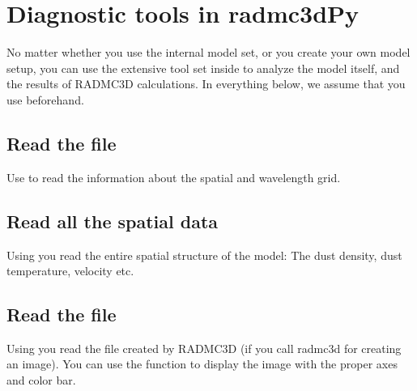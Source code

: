 \documentclass[letterpaper,10pt,english]{sphinxmanual}
\begin{document}
\begin{sphinxVerbatim}[commandchars=\\\{\}]
   
   
   
\end{sphinxVerbatim}


\section{Diagnostic tools in radmc3dPy}
\label{\detokenize{pythontools:diagnostic-tools-in-radmc3dpy}}
No matter whether you use the \sphinxhyphen{}internal model set, or you create
your own model setup, you can use the extensive tool set inside  to
analyze the model itself, and the results of RADMC\sphinxhyphen{}3D calculations. In
everything below, we assume that you use  beforehand.


\subsection{Read the  file}
\label{\detokenize{pythontools:read-the-amr-grid-inp-file}}
Use  to read the information about the
spatial and wavelength grid.


\subsection{Read all the spatial data}
\label{\detokenize{pythontools:read-all-the-spatial-data}}
Using  you read the entire spatial
structure of the model: The dust density, dust temperature, velocity
etc.


\subsection{Read the  file}
\label{\detokenize{pythontools:read-the-image-out-file}}
Using  you read the 
file created by RADMC\sphinxhyphen{}3D (if you call radmc3d for creating an image).
You can use the  function to display
the image with the proper axes and color bar.
\end{document}
